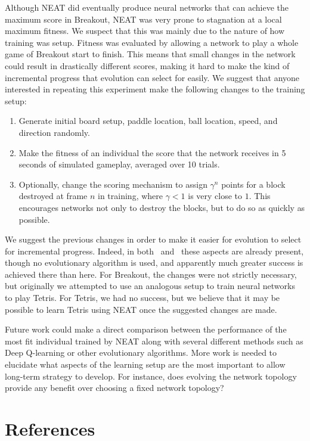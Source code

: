 \documentclass[letterpaper, twocolumn]{article}
\begin{document}
Although NEAT did eventually produce neural networks that can achieve the maximum score
in Breakout, NEAT was very prone to stagnation at a local maximum fitness.
We suspect that this was mainly due to the nature of how training was setup.
Fitness was evaluated by allowing a network to play a whole game of Breakout start to finish.
This means that small changes in the network could result in drastically different scores, making it hard
to make the kind of incremental progress that evolution can select for easily.
We suggest that anyone interested in repeating this experiment make the following changes to
the training setup:
\begin{enumerate}
    \item{} Generate initial board setup, paddle location, ball location, speed, and direction randomly.
    \item{} Make the fitness of an individual the score that the network receives in 5 seconds of simulated gameplay, averaged over 10 trials.
    \item{} Optionally, change the scoring mechanism to assign $\gamma^n$ points for a block destroyed
        at frame $n$ in training, where $\gamma<1$ is very close to $1$. 
        This encourages networks not only to destroy the blocks, but to do so as quickly as possible.
\end{enumerate}

We suggest the previous changes in order to make it easier for evolution to select for incremental progress.
Indeed, in both~\cite{mnih2013playing} and~\cite{mnih2015human} these aspects are already present,
though no evolutionary algorithm is used, and apparently much greater success is achieved there than here.
For Breakout, the changes were not strictly necessary, but originally we attempted to use an analogous
setup to train neural networks to play Tetris.
For Tetris, we had no success, but we believe that it may be possible to learn Tetris using NEAT
once the suggested changes are made.

Future work could make a direct comparison between the performance of the most fit individual trained by
NEAT along with several different methods such as Deep Q-learning or other evolutionary algorithms.
More work is needed to elucidate what aspects of the learning setup are the most important to allow
long-term strategy to develop. For instance, does evolving the network topology provide any benefit over
choosing a fixed network topology?

\begingroup
    \section{References}
    \renewcommand{\section}[2]{}
    \nocite{*}
    
    \begin{raggedright}
    
    \end{raggedright}
\endgroup
\end{document}
